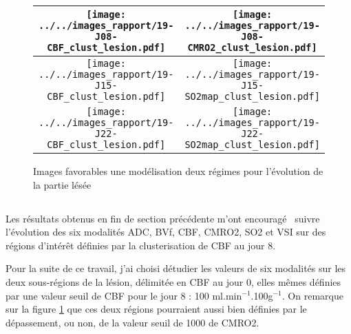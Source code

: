 \begin{figure}[!p]
\begin{center}
\begin{tabular}{|c|c|}
\hline
\texttt{[image: ../../images\_rapport/19-J08-CBF\_clust\_lesion.pdf]}
&
\texttt{[image: ../../images\_rapport/19-J08-CMRO2\_clust\_lesion.pdf]}
\\
\hline
\texttt{[image: ../../images\_rapport/19-J15-CBF\_clust\_lesion.pdf]}
&
\texttt{[image: ../../images\_rapport/19-J15-SO2map\_clust\_lesion.pdf]}
\\
\hline
\texttt{[image: ../../images\_rapport/19-J22-CBF\_clust\_lesion.pdf]}
&
\texttt{[image: ../../images\_rapport/19-J22-SO2map\_clust\_lesion.pdf]}
\\
\hline
\end{tabular}
\end{center}
\caption{Images favorables  une mod\'elisation  deux r\'egimes pour l'\'evolution de la partie l\'es\'ee}
\label{19_reg_clust_les}
\end{figure}


\FloatBarrier
\subsection{}%

Les r\'esultats obtenus en fin de section pr\'ec\'edente m'ont encourag\'e  suivre l'\'evolution des six modalit\'es %
ADC, BVf, CBF, CMRO2, SO2 et VSI sur des r\'egions d'int\'er\^et d\'efinies par la clusterisation de CBF au jour 8.%

%
%
%

\ligneinter
Pour la suite de ce travail, j'ai choisi d\'etudier les valeurs de six modalit\'es sur les deux sous-r\'egions de la l\'esion, d\'elimit\'ee en CBF au jour 0, %
elles m\^emes d\'efinies par une valeur seuil de CBF pour le jour 8 : 100 ml.min${}^{-1}$.100g${}^{-1}$. %
On remarque sur la figure \ref{19_reg_clust_les} que ces deux r\'egions pourraient aussi bien d\'efinies par le d\'epassement, ou non, de la valeur seuil de 1000 %
de CMRO2.

